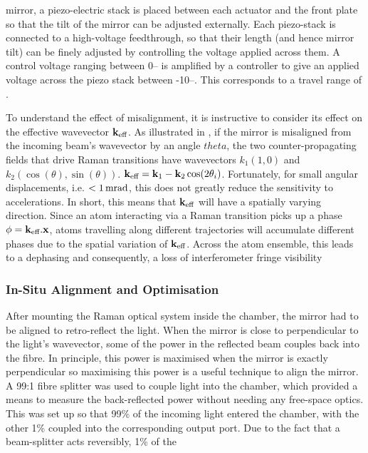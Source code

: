 mirror, a piezo-electric stack is placed between each actuator and the front
plate so that the tilt of the mirror can be adjusted externally. Each
piezo-stack is connected to a high-voltage feedthrough, so that their length
(and hence mirror tilt) can be finely adjusted by controlling the voltage
applied across them. A control voltage ranging between 0-- is
amplified by a controller to give an applied voltage across the piezo stack
between -10--. This corresponds to a travel range of
. \par\noindent To understand the effect of
misalignment, it is instructive to consider its effect on the effective
wavevector \({\textbf k_\textnormal{eff}}\). As illustrated in , if the
mirror is misaligned from the incoming beam's wavevector by an angle \(theta\),
the two counter-propagating fields that drive Raman transitions have wavevectors
\(k_1 \left(1,0\right)\) and \(k_2 \left(\cos(\theta),\sin(\theta)\right)\).
\({\textbf k_\textnormal{eff}} = {\textbf k_1} - {\textbf k_2} \cos (2\theta_i)\). Fortunately, for
small angular displacements, i.e. \(< \sivalue{1}{\milli\radian}\), this does
not greatly reduce the sensitivity to accelerations. In short, this means that
\({\textbf k_\textnormal{eff}}\) will have a spatially varying direction. Since an atom interacting via
a Raman transition picks up a phase \(\phi = {\textbf k_\textnormal{eff}} . {\textbf x}\), atoms
travelling along different trajectories will accumulate different phases due to
the spatial variation of \({\textbf k_\textnormal{eff}}{}\). Across the atom ensemble, this leads to a
dephasing and consequently, a loss of interferometer fringe
visibility~\cite{Tackmann2012} \subsubsection{In-Situ Alignment and
Optimisation} After mounting the Raman optical system inside the chamber, the
mirror had to be aligned to retro-reflect the light. When the mirror is close to
perpendicular to the light's wavevector, some of the power in the reflected beam
couples back into the fibre. In principle, this power is maximised when the
mirror is exactly perpendicular so maximising this power is a useful technique
to align the mirror. A 99:1 fibre splitter was used to couple light into the
chamber, which provided a means to measure the back-reflected power without
needing any free-space optics. This was set up so that 99\% of the incoming
light entered the chamber, with the other 1\% coupled into the corresponding
output port. Due to the fact that a beam-splitter acts reversibly, 1\% of the
